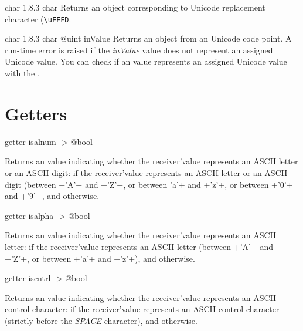 {char}
{1.8.3}
{char}
{Returns an  object corresponding to Unicode replacement character (\texttt{\textquotesingle\textbackslash uFFFD}.}
{}







{char}
{1.8.3}
{char}
{@uint inValue}
{Returns an  object from an Unicode code point.}
{A run-time error is raised if the \emph{inValue} value does not represent an assigned Unicode value. You can check if an  value represents an assigned Unicode value with the .}


\section{Getters}



\begin{galgascode}
getter isalnum -> @bool
\end{galgascode}

Returns an  value indicating whether the receiver'value represents an ASCII letter or an ASCII digit:  if the receiver'value represents an ASCII letter or an ASCII digit (between \ggs+'A'+ and \ggs+'Z'+, or between \ggs'a'+ and \ggs+'z'+, or between \ggs+'0'+ and \ggs+'9'+, and  otherwise.





\begin{galgascode}
getter isalpha -> @bool
\end{galgascode}

Returns an  value indicating whether the receiver'value represents an ASCII letter:  if the receiver'value represents an ASCII letter (between \ggs+'A'+ and \ggs+'Z'+, or between \ggs+'a'+ and \ggs+'z'+), and  otherwise.





\begin{galgascode}
getter iscntrl -> @bool
\end{galgascode}

Returns an  value indicating whether the receiver'value represents an ASCII control character:  if the receiver'value represents an ASCII control character (strictly before the \emph{SPACE} character), and  otherwise.





